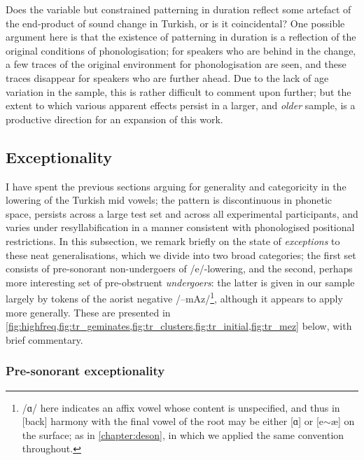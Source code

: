 Does the variable but constrained patterning in duration reflect some artefact of the end-product of sound change in Turkish, or is it coincidental? One possible argument here is that the existence of patterning in duration is a reflection of the original conditions of phonologisation; for speakers who are behind in the change, a few traces of the original environment for phonologisation are seen, and these traces disappear for speakers who are further ahead. Due to the lack of age variation in the sample, this is rather difficult to comment upon further; but the extent to which various apparent effects persist in a larger, and \emph{older} sample, is a productive direction for an expansion of this work.

\subsection{Exceptionality}\label{ss:trexceptions}

I have spent the previous sections arguing for generality and categoricity in the lowering of the Turkish mid vowels; the pattern is discontinuous in phonetic space, persists across a large test set and across all experimental participants, and varies under resyllabification in a manner consistent with phonologised positional restrictions. In this subsection, we remark briefly on the state of \emph{exceptions} to these neat generalisations, which we divide into two broad categories; the first set consists of pre-sonorant non-undergoers of /e/-lowering, and the second, perhaps more interesting set of pre-obstruent \emph{undergoers}: the latter is given in our sample largely by tokens of the aorist negative /–mAz/\footnote{/ɑ/ here indicates an affix vowel whose content is unspecified, and thus in [back] harmony with the final vowel of the root may be either [ɑ] or [e$\sim$æ] on the surface; as in \cref{chapter:deson}, in which we applied the same convention throughout.}, although it appears to apply more generally. These are presented in \cref{fig:highfreq,fig:tr_geminates,fig:tr_clusters,fig:tr_initial,fig:tr_mez} below, with brief commentary.

\subsubsection{Pre-sonorant exceptionality}

